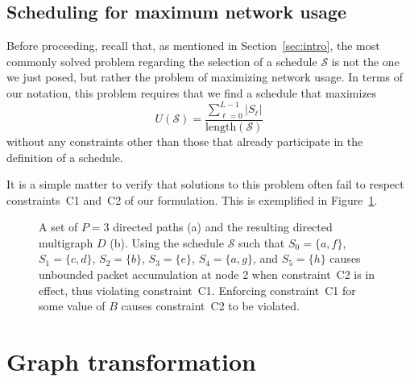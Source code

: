 \documentclass{article}
\begin{document}
\subsection{Scheduling for maximum network usage}

Before proceeding, recall that, as mentioned in Section~\ref{sec:intro}, the
most commonly solved problem regarding the selection of a schedule $\mathcal{S}$
is not the one we just posed, but rather the problem of maximizing network
usage. In terms of our notation, this problem requires that we find a schedule
that maximizes
\begin{equation}
U(\mathcal{S})=
\frac{\sum_{\ell=0}^{L-1}\vert S_\ell\vert}{\mathrm{length}(\mathcal{S})}
\end{equation}
without any constraints other than those that already participate in the
definition of a schedule.

It is a simple matter to verify that solutions to this problem often fail to
respect constraints~C1 and~C2 of our formulation. This is exemplified in
Figure~\ref{fig2}.

\begin{figure}[t]
\centering
{}
\caption{A set of $P=3$ directed paths (a) and the resulting directed multigraph
$D$ (b). Using the schedule $\mathcal{S}$ such that $S_0=\{a,f\}$,
$S_1=\{c,d\}$, $S_2=\{b\}$, $S_3=\{e\}$, $S_4=\{a,g\}$, and $S_5=\{h\}$ causes
unbounded packet accumulation at node $2$ when constraint~C2 is in effect, thus
violating constraint~C1. Enforcing constraint~C1 for some value of $B$ causes
constraint~C2 to be violated.}
\label{fig2}
\end{figure}

\section{Graph transformation}\label{sec:transf}
\end{document}
